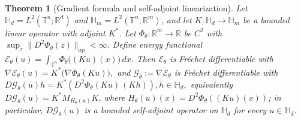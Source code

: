 \documentclass[10pt,a4paper]{amsart}
\newtheorem{theorem}{Theorem}
\newcommand{\Hd}{\mathbb{H}_d}
\newcommand{\Hm}{\mathbb{H}_m}
\begin{document}
\begin{theorem}[Gradient formula and self-adjoint linearization]\label{nsafno}
Let $\Hd=L^2(\mathbb{T}^n;\mathbb{R}^d)$ and $\Hm=L^2(\mathbb{T}^n;\mathbb{R}^m)$, and let $K:\Hd\to\Hm$ be a bounded linear operator with adjoint $K^*$. Let $\Phi_\theta:\mathbb{R}^m\to\mathbb{R}$ be $C^2$ with $\sup_{z}\|D^2\Phi_\theta(z)\|_{\mathrm{op}}<\infty$. Define energy functional 
\(
\mathcal{E}_\theta(u)=\int_{\mathbb{T}^n}\Phi_\theta\big((Ku)(x)\big)\,dx.
\)
Then $\mathcal{E}_\theta$ is Fr\'echet differentiable with
\(
\nabla\mathcal{E}_\theta(u)=K^*\big(\nabla\Phi_\theta(Ku)\big),
\)
and $\mathcal{G}_\theta:=\nabla\mathcal{E}_\theta$ is Fr\'echet differentiable with
\(
D\mathcal{G}_\theta(u)h = K^*\!\left(D^2\Phi_\theta(Ku)\,(Kh)\right), h\in\Hd,
\)
equivalently $D\mathcal{G}_\theta(u)=K^* M_{H_\theta(u)} K$, where $H_\theta(u)(x)=D^2\Phi_\theta((Ku)(x))$; in particular, $D\mathcal{G}_\theta(u)$ is a bounded self-adjoint operator on $\Hd$ for every $u\in\Hd$.
\end{theorem}
\end{document}
